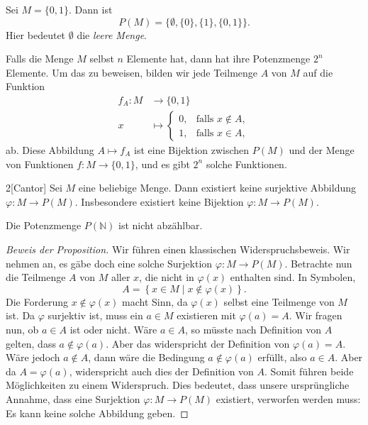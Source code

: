 \documentclass[../main.tex]{subfiles}
\begin{document}
\begin{example}
  Sei $M = \{0, 1\}$. Dann ist
  \[
    P(M) = \{ \emptyset, \{0\}, \{1\}, \{0, 1\}\}.
  \]
  Hier bedeutet $\emptyset$ die \textit{leere Menge}.
\end{example}

\begin{remark}
  Falls die Menge $M$ selbst $n$ Elemente hat, dann hat ihre
  Potenzmenge $2^{n}$ Elemente. Um das zu beweisen,
  bilden wir jede Teilmenge $A$ von $M$
  auf die Funktion
  \begin{align*}
    f_{A} \colon  M &\to \{0, 1\} \\
     x &\mapsto
      \begin{cases}
        0, & \mbox{falls } x \notin A, \\
        1, & \mbox{falls } x \in A,
      \end{cases}
  \end{align*}
  ab.
  Diese Abbildung $A \mapsto f_{A}$ ist eine Bijektion zwischen
  $P(M)$ und der Menge von Funktionen $f \colon M \to \{0, 1\}$,
  und es gibt $2^{n}$
  solche Funktionen.
\end{remark}

\begin{manualproposition}{2}[Cantor]\label{prop:cantor}
  Sei $M$ eine beliebige Menge.
  Dann existiert keine surjektive Abbildung $\varphi \colon M \to P(M)$.
  Insbesondere existiert keine Bijektion $\varphi \colon M \to P(M)$.
\end{manualproposition}

\begin{corollary}
  Die Potenzmenge $P(\mathbb N)$ ist nicht abzählbar.
\end{corollary}

\begin{proof}[Beweis der Proposition]
  Wir führen einen klassischen Widerspruchsbeweis.
  Wir nehmen an, es gäbe doch eine solche Surjektion
  $\varphi \colon M \to P(M)$.
  Betrachte nun die Teilmenge $A$ von $M$ aller $x$, die nicht
  in $\varphi(x)$ enthalten sind. In Symbolen,
  \[
    A = \left\{x \in M \mid x \notin \varphi(x)\right\}.
  \]
  Die Forderung $x \notin \varphi(x)$ macht Sinn,
  da $\varphi(x)$ selbst eine Teilmenge von $M$ ist.
  Da $\varphi$ surjektiv ist, muss ein $a \in M$
  existieren mit $\varphi(a) = A$. Wir fragen nun,
  ob $a \in A$ ist oder nicht.
  Wäre $a \in A$, so müsste nach Definition von $A$
  gelten, dass $a \notin \varphi(a)$. Aber das
  widerspricht der Definition von $\varphi(a) = A$.
  Wäre jedoch $a \notin A$, dann wäre die Bedingung
  $a \notin \varphi(a)$ erfüllt, also $a \in A$.
  Aber da $A = \varphi(a)$, widerspricht auch dies
  der Definition von $A$. Somit führen beide Möglichkeiten
  zu einem Widerspruch. Dies bedeutet, dass unsere
  ursprüngliche Annahme, dass eine Surjektion
  $\varphi \colon M \to P(M)$ existiert, verworfen werden muss:
  Es kann keine solche Abbildung geben.
\end{proof}
\end{document}
